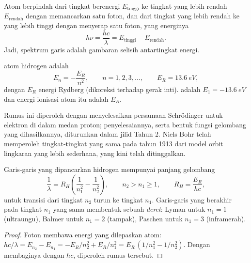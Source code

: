 Atom berpindah dari tingkat berenergi $E_{\text{tinggi}}$ ke tingkat yang
lebih rendah $E_{\text{rendah}}$ dengan memancarkan satu foton, dan dari
tingkat yang lebih rendah ke yang lebih tinggi dengan menyerap satu foton,
yang energinya
\[
  h\nu = \frac{hc}{\lambda} = E_{\text{tinggi}} - E_{\text{rendah}} .
\]
Jadi, spektrum garis adalah gambaran selisih antartingkat energi.

\begin{theorem}\label{thm:b1:quantum-numbers:levels}
 atom hidrogen adalah
\[
  E_n = -\frac{E_R}{n^2}, \qquad n = 1, 2, 3, \dots,
  \qquad E_R = \qty{13.6}{eV},
\]
dengan $E_R$ energi Rydberg (dikoreksi terhadap gerak inti).  adalah $E_1 = \qty{-13.6}{eV}$ dan energi ionisasi atom itu
adalah $E_R$.
\end{theorem}
\admitted

\begin{remark}\label{rem:b1:quantum-numbers:schrodinger}
Rumus ini diperoleh dengan menyelesaikan persamaan Schrödinger untuk
elektron di dalam medan proton; penyelesaiannya, serta bentuk fungsi
gelombang yang dihasilkannya, diturunkan dalam jilid Tahun 2. Niels Bohr
telah memperoleh tingkat-tingkat yang sama pada tahun 1913 dari model
orbit lingkaran yang lebih sederhana, yang kini telah ditinggalkan.
\end{remark}

\begin{proposition}\label{prop:b1:quantum-numbers:rydberg}
Garis-garis yang dipancarkan hidrogen mempunyai panjang gelombang
\[
  \frac{1}{\lambda} = R_H\left(\frac{1}{n_1^2} - \frac{1}{n_2^2}\right),
  \qquad n_2 > n_1 \ge 1, \qquad R_H = \frac{E_R}{hc},
\]
untuk transisi dari tingkat $n_2$ turun ke tingkat $n_1$. Garis-garis
yang berakhir pada tingkat $n_1$ yang sama membentuk sebuah
\emph{deret}: Lyman untuk $n_1 = 1$ (ultraungu), Balmer untuk $n_1 = 2$
(tampak), Paschen untuk $n_1 = 3$ (inframerah).
\end{proposition}

\begin{proof}
Foton membawa energi yang dilepaskan atom:
$hc/\lambda = E_{n_2} - E_{n_1} = -E_R/n_2^2 + E_R/n_1^2
= E_R\,(1/n_1^2 - 1/n_2^2)$. Dengan membaginya dengan $hc$, diperoleh rumus tersebut.
\end{proof}

